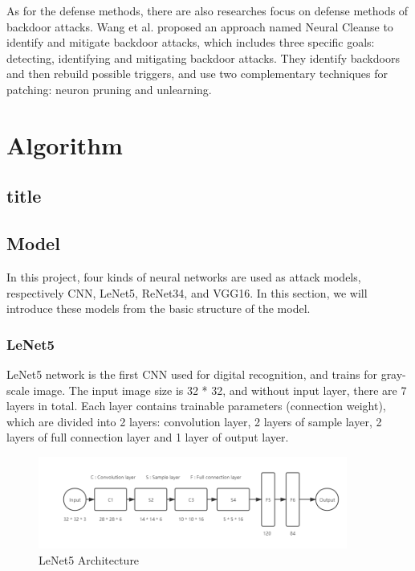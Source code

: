 \documentclass[runningheads]{llncs}
\begin{document}
As for the defense methods, there are also researches focus on defense methods of backdoor attacks. Wang et al. proposed an approach named Neural Cleanse to identify and mitigate backdoor attacks, which includes three specific goals: detecting, identifying and mitigating backdoor attacks\cite{wang2019neural}. They identify backdoors and then rebuild possible triggers, and use two complementary techniques for patching: neuron pruning and unlearning. 

\section{Algorithm}

\subsection{title}


\subsection{Model}
In this project, four kinds of neural networks are used as attack models, respectively CNN, LeNet5, ReNet34, and VGG16. In this section, we will introduce these models from the basic structure of the model.
\subsubsection{LeNet5}
LeNet5 network is the first CNN used for digital recognition, and trains for gray-scale image\cite{m1}. The input image size is 32 * 32, and without input layer, there are 7 layers in total. Each layer contains trainable parameters (connection weight), which are divided into 2 layers: convolution layer, 2 layers of sample layer, 2 layers of full connection layer and 1 layer of output layer\cite{m2}.
\begin{figure}
	\centering
	\includegraphics[width=4.0in]{figures/p1.png}
	\caption{LeNet5 Architecture}
\end{figure}
\end{document}
